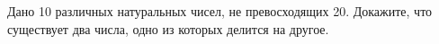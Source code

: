 \question 
Дано 10 различных натуральных чисел, не превосходящих 20. Докажите, что существует два числа, одно из которых делится на другое.
